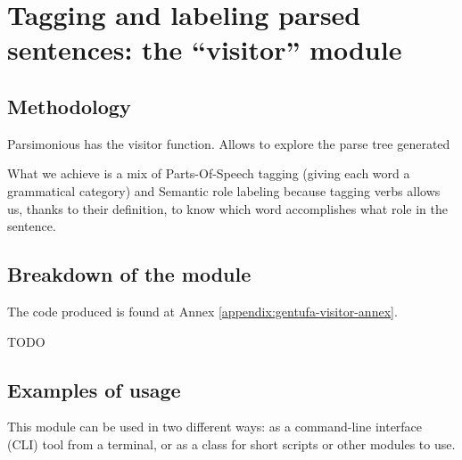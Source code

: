 \chapter{Tagging and labeling parsed sentences: the ``visitor'' module}
\label{chap:visitor-module}

\section{Methodology}

Parsimonious has the visitor function. Allows to explore the parse tree generated

What we achieve is a mix of Parts-Of-Speech tagging (giving each word a grammatical category) and Semantic role labeling
because tagging verbs allows us, thanks to their definition, to know which word accomplishes what role in the sentence.



\section{Breakdown of the module}
\label{sec:visitor-code-breakdown}

The code produced is found at Annex \ref{appendix:gentufa-visitor-annex}.

TODO

\newpage

\section{Examples of usage}

This module can be used in two different ways: as a command-line interface (CLI) tool
from a terminal, or as a class for short scripts or other modules to use.

